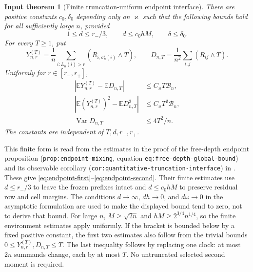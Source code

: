 \documentclass[11pt]{article}
\numberwithin{equation}{section}
\newcommand{\E}{\mathbb E}
\newcommand{\Var}{\operatorname{Var}}
\newtheorem{inputtheorem}[theorem]{Input theorem}
\theoremstyle{definition}
\theoremstyle{remark}
\begin{document}
\begin{inputtheorem}[Finite truncation-uniform endpoint interface]
\label{input:endpoint}
There are positive constants $c_0,\delta_0$ depending only on $\varkappa$ such
that the following bounds hold for all sufficiently large $n$, provided
\[
 1\le d\le r_-/3,\qquad d\le c_0hM,\qquad \delta\le\delta_0.
\]
For every $T\ge1$, put
\[
 Y_{n,r}^{(T)}=\frac1n\sum_{i:L_n(i)>r}(R_{i,\sigma_n^r(i)}\wedge T),
 \qquad D_{n,T}=\frac1{n^2}\sum_{i,j}(R_{ij}\wedge T).
\]
Uniformly for $r\in[r_-,r_+]$,
\begin{align}
 |\E Y_{n,r}^{(T)}-\E D_{n,T}|
 &\le C_\varkappa T\mathcal B_n,
 \label{eq:endpoint-first}\\
 |\E(Y_{n,r}^{(T)})^2-\E D_{n,T}^2|
 &\le C_\varkappa T^2\mathcal B_n,
 \label{eq:endpoint-second}\\
 \Var D_{n,T}&\le 4T^2/n.
 \label{eq:endpoint-independent-var}
\end{align}
The constants are independent of $T,d,r_-,r_+$.
\end{inputtheorem}

This finite form is read from the estimates in the proof of the
free-depth endpoint proposition (\texttt{prop:endpoint-mixing},
equation \texttt{eq:free-depth-global-bound}) and its observable corollary
(\texttt{cor:quantitative-truncation-interface}) in
\cite{LongMesoscopic2026}.  These give
\eqref{eq:endpoint-first}--\eqref{eq:endpoint-second}.
Their finite estimates use $d\le r_-/3$ to leave the frozen prefixes intact
and $d\le c_0hM$ to preserve residual row and cell margins.  The conditions
$d\to\infty$, $dh\to0$, and $d\omega\to0$ in the asymptotic formulation are
used to make the displayed bound tend to zero, not to derive that bound.
For large $n$, $M\ge\sqrt{2n}$ and $hM\ge2^{3/4}n^{1/4}$, so the
finite environment estimates apply uniformly.  If the bracket is bounded
below by a fixed positive constant, the first two estimates also follow
from the trivial bounds $0\le Y_{n,r}^{(T)},D_{n,T}\le T$.
The last inequality follows
by replacing one clock: at most $2n$ summands change, each by at most $T$.
No untruncated selected second moment is required.
\end{document}
